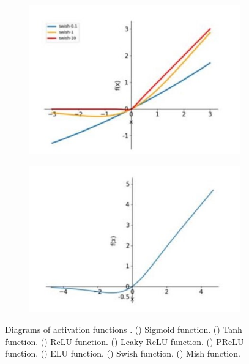 \begin{figure}[h!]
\begin{subfigure}{0.22\textwidth}
		\includegraphics[width=\linewidth]{Images/DataMining/SwishFunctions}
		\caption{}    %
		\label{subfig:Swish}
	\end{subfigure}
	\hfill
	\begin{subfigure}{0.22\textwidth}
		\includegraphics[width=\linewidth]{Images/DataMining/MishFunction}
		\caption{}    %
		\label{subfig:Mish}
	\end{subfigure}
	
	\caption{Diagrams of activation functions \cite{Li:2021}.  () Sigmoid function.  () Tanh function. () ReLU function. () Leaky ReLU function. () PReLU function. () ELU function.  () Swish function. () Mish function.}
	\label{fig:activationFunctions}
\end{figure}

